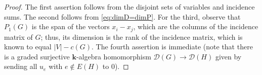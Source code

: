 \documentclass[12pt]{amsart}
\newtheorem{proposition}[theorem]{Proposition}
\theoremstyle{definition}
\theoremstyle{remark}
\newcommand{\kk}{\mathbf{k}}
\begin{document}

\begin{proof}
The first assertion follows from the disjoint sets of variables and incidence
sums.  The second follows from \eqref{eq:dimD=dimP}.  For the third,
observe that $P_1(G)$ is the span of the vectors $x_i-x_j$, which are the
columns of the incidence matrix of $G$; thus, its dimension is the rank of
the incidence matrix, which is known to equal $|V|-c(G)$.
The fourth assertion is immediate (note that there is a graded surjective
$\kk$-algebra homomorphism $\mathcal D(G) \to \mathcal D(H)$ given by sending
all $u_e$ with $e \notin E(H)$ to $0$).
\end{proof}
\end{document}
